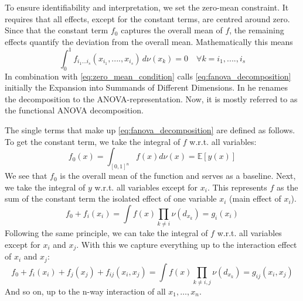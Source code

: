 To ensure identifiability and interpretation, we set the zero-mean constraint. It requires that all effects, except for the constant terms, are centred around zero. Since that the constant term $f_0$ captures the overall mean of $f$, the remaining effects quantify the deviation from the overall mean. Mathematically this means
\begin{equation}
    \int_{0}^{1} f_{i_{1}...i_{s}} (x_{i_{1}}, ...., x_{i_{s}}) \, d\nu (x_k) = 0 \quad \forall k = i_1, ...., i_s
    \label{eq:zero_mean_condition}
\end{equation}
In combination with \autoref{eq:zero_mean_condition}  \cite{sobol1993sensitivity} calls \autoref{eq:fanova_decomposition} initially the \ldq Expansion into Summands of Different Dimensions\rdq. In \cite{sobol2001} he renames the decomposition to the \ldq ANOVA-representation\rdq. Now, it is mostly referred to as the \ldq functional ANOVA decomposition\rdq \citep{hooker2004}.\par


The single terms that make up \autoref{eq:fanova_decomposition} are defined as follows.
To get the constant term, we take the integral of $f$ w.r.t. all variables:
\begin{equation}
    f_{0}(x) = \int_{[0, 1]^n} f(x) d\nu(x) = \mathbb{E}[y(x)]
    \label{eq:intercapt}
\end{equation}
We see that $f_0$ is the overall mean of the function and serves as a baseline. Next, we take the integral of $y$ w.r.t. all variables except for $x_i$. This represents $f$ as the sum of the constant term the isolated effect of one variable $x_i$ (main effect of $x_i$).
\begin{equation}
    f_0 + f_i(x_i) = \int f(x) \prod_{k \neq i} \nu (d_{x_{k}}) = g_i(x_i)
    \label{eq:main_effect}
\end{equation}
Following the same principle, we can take the integral of $f$ w.r.t. all variables except for $x_i$ and $x_j$. With this we capture everything up to the interaction effect of $x_i$ and $x_j$:
\begin{equation}
    f_0 + f_i(x_i) + f_j(x_j) + f_{ij}(x_i,x_j) = \int f(x) \prod_{k \neq i,j} \nu(d_{x_{k}}) = g_{ij}(x_i, x_j)
    \label{eq:interaction_effects}
\end{equation}
And so on, up to the n-way interaction of all $x_1, \dots, x_n$.\par

